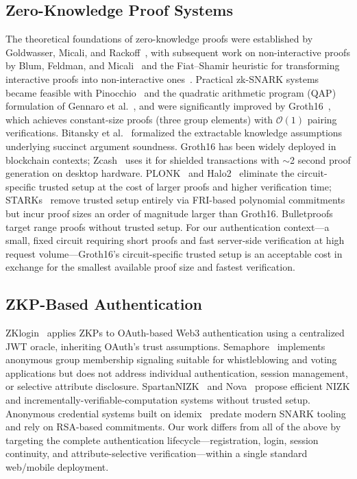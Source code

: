 \documentclass[journal,twoside,10pt]{IEEEtran}
\begin{document}
\subsection{Zero-Knowledge Proof Systems}
The theoretical foundations of zero-knowledge proofs were established by
Goldwasser, Micali, and Rackoff~\cite{gmr89}, with subsequent work on
non-interactive proofs by Blum, Feldman, and Micali~\cite{bfm88} and the
Fiat--Shamir heuristic for transforming interactive proofs into
non-interactive ones~\cite{fiatshamir}. Practical zk-SNARK systems became
feasible with Pinocchio~\cite{parno13} and the quadratic arithmetic program
(QAP) formulation of Gennaro et al.~\cite{gennaro13}, and were significantly
improved by Groth16~\cite{groth16}, which achieves constant-size proofs
(three group elements) with $\mathcal{O}(1)$ pairing verifications. Bitansky et al.~\cite{bitansky12} formalized the extractable
knowledge assumptions underlying succinct argument soundness.
Groth16 has been widely deployed in blockchain contexts; Zcash~\cite{zcash14}
uses it for shielded transactions with $\sim$2 second proof generation on
desktop hardware. PLONK~\cite{plonk}
and Halo2~\cite{halo2} eliminate the circuit-specific trusted setup at the
cost of larger proofs and higher verification time; STARKs~\cite{starks}
remove trusted setup entirely via FRI-based polynomial commitments but incur
proof sizes an order of magnitude larger than Groth16. Bulletproofs~\cite{bulletproofs}
target range proofs without trusted setup. For our authentication context---a
small, fixed circuit requiring short proofs and fast server-side
verification at high request volume---Groth16's circuit-specific trusted
setup is an acceptable cost in exchange for the smallest available proof
size and fastest verification.

\subsection{ZKP-Based Authentication}
ZKlogin~\cite{zklogin} applies ZKPs to OAuth-based Web3 authentication using
a centralized JWT oracle, inheriting OAuth's trust assumptions.
Semaphore~\cite{semaphore} implements anonymous group membership signaling
suitable for whistleblowing and voting applications but does not address
individual authentication, session management, or selective attribute
disclosure. SpartanNIZK~\cite{spartan} and Nova~\cite{nova} propose efficient
NIZK and incrementally-verifiable-computation systems without trusted setup.
Anonymous credential systems built on idemix~\cite{idemix} predate modern
SNARK tooling and rely on RSA-based commitments. Our work differs from all of the above by
targeting the complete authentication lifecycle---registration, login,
session continuity, and attribute-selective verification---within a single
standard web/mobile deployment.
\end{document}
